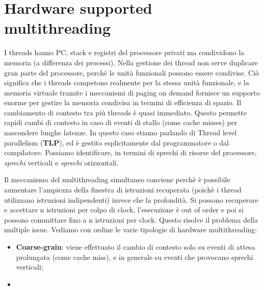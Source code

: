 \section{Hardware supported multithreading}
I threads hanno PC, stack e registri del processore privati ma condividono la memoria (a differenza dei processi). Nella gestione dei thread non serve duplicare gran parte del processore, perchè le unità funzionali possono essere condivise. Ciò significa che i threads competono realmente per la stessa unità funzionale, e la memoria virtuale tramite i meccanismi di paging on demand fornisce un supporto enorme per gestire la memoria condivisa in termini di efficienza di spazio. Il cambiamento di contesto tra più threads è quasi immediato. Questo permette rapidi cambi di contesto in caso di eventi di stallo (come cache misses) per nascondere lunghe latenze. In questo caso stiamo parlando di Thread level parallelism (\textbf{TLP}), ed è gestito esplicitamente dal programmatore o dal compilatore. 
Possiamo identificare, in termini di sprechi di risorse del processore, \textit{sprechi} verticali e \textit{sprechi} orizzontali.

\begin{figure}[ht]
    \centering
    \setlength{\fboxrule}{0.5pt} %
    \setlength{\fboxsep}{0pt}    %
\end{figure}

Il meccanismo del multithreading simultaneo conviene perchè è possibile aumentare l'ampiezza della finestra di istruzioni recuperata (poichè i thread utilizzano istruzioni indipendenti) invece che la profondità. Si possono recuperare e accettare n istruzioni per colpo di clock, l'esecuzione è out of order e poi si possono committare fino a n istruzioni per clock. Questo risolve il problema della multiple issue. Vediamo con ordine le varie tipologie di hardware multithreading:

\begin{itemize}
    \item \textbf{Coarse-grain}: viene effettuato il cambio di contesto solo su eventi di attesa prolungata (come cache miss), e in generale su eventi che provocano sprechi verticali;
    \item 
\end{itemize}

